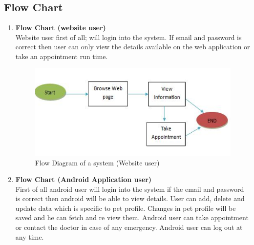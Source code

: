 \subsection{Flow Chart}
\begin{enumerate}
\item \textbf{Flow Chart (website user)}\\
Website user first of all; will login into the system. If email and password is correct then user can only view the details available on the web application or take an appointment run time.

\begin{figure}[H]
\centering
  \includegraphics[scale=0.5]{figflow}
  \caption{Flow Diagram of a system (Website user)}
\end{figure}

\item \textbf{Flow Chart (Android Application user)}
\\ First of all android user will login into the system if the email and password is correct then android will be able to view details. User can add, delete and update data which is specific to pet profile. Changes in pet profile will be saved and he can fetch and re view them. Android user can take appointment or contact the doctor in case of   any emergency. Android user can log out at any time.


\end{enumerate}

